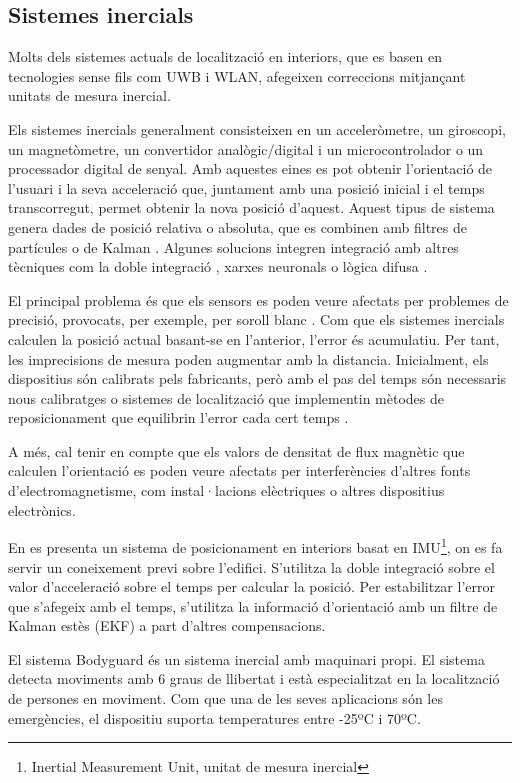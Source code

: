 \subsection{Sistemes inercials}

Molts dels sistemes actuals de localització en interiors, que es basen en tecnologies sense fils com UWB i WLAN, afegeixen correccions mitjançant unitats de mesura inercial.

Els sistemes inercials generalment consisteixen en un acceleròmetre, un giroscopi, un magnetòmetre, un convertidor analògic/digital i un microcontrolador o un processador digital de senyal. Amb aquestes eines es pot obtenir l'orientació de l’usuari i la seva acceleració que, juntament amb una posició inicial i el temps transcorregut, permet obtenir la nova posició d’aquest. Aquest tipus de sistema genera dades de posició relativa o absoluta, que es combinen amb filtres de partícules o de Kalman \cite{vilaseca}. Algunes solucions integren integració amb altres tècniques com la doble integració \cite{negard}, xarxes neuronals \cite{beauregard} o lògica difusa \cite{tome} \cite{garcia}.

El principal problema és que els sensors es poden veure afectats per problemes de precisió, provocats, per exemple, per soroll blanc \cite{vilaseca}. Com que els sistemes inercials calculen la posició actual basant-se en l'anterior, l’error és acumulatiu. Per tant, les imprecisions de mesura poden augmentar amb la distancia. Inicialment, els dispositius són calibrats pels fabricants, però amb el pas del temps són necessaris nous calibratges o sistemes de localització que implementin mètodes de reposicionament que equilibrin l'error cada cert temps \cite{glanzer}.

A més, cal tenir en compte que els valors de densitat de flux magnètic que calculen l'orientació es poden veure afectats per interferències d’altres fonts d’electromagnetisme, com instal·lacions elèctriques o altres dispositius electrònics.

En \cite{glanzer} es presenta un sistema de posicionament en interiors basat en IMU\footnote{Inertial Measurement Unit, unitat de mesura inercial}, on es fa servir un coneixement previ sobre l’edifici. S’utilitza la doble integració sobre el valor d'acceleració sobre el temps per calcular la posició. Per estabilitzar l'error que s'afegeix amb el temps, s'utilitza la informació d'orientació amb un filtre de Kalman estès (EKF) a part d'altres compensacions.

El sistema Bodyguard \cite{koppe} és un sistema inercial amb maquinari propi. El sistema detecta moviments amb 6 graus de llibertat i està especialitzat en la localització de persones en moviment. Com que una de les seves aplicacions són les emergències, el dispositiu suporta temperatures entre -25ºC i 70ºC.

